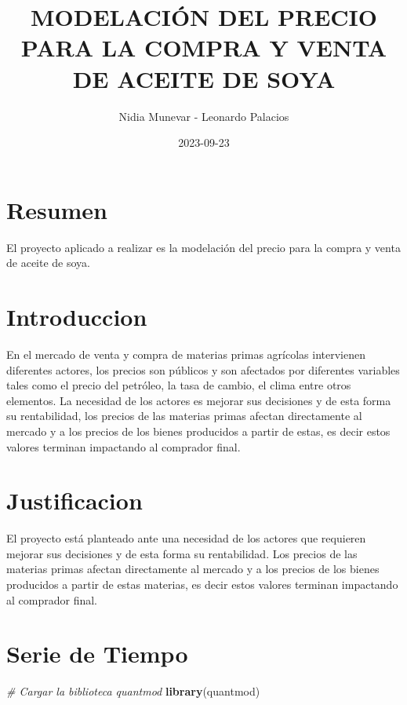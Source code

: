 \documentclass[
]{book}
\title{MODELACIÓN DEL PRECIO PARA LA COMPRA Y VENTA DE ACEITE DE SOYA}
\author{Nidia Munevar - Leonardo Palacios}
\date{2023-09-23}
\newenvironment{Shaded}{\begin{snugshade}}{\end{snugshade}}
\newcommand{\CommentTok}[1]{\textcolor[rgb]{0.56,0.35,0.01}{\textit{#1}}}
\newcommand{\FunctionTok}[1]{\textcolor[rgb]{0.13,0.29,0.53}{\textbf{#1}}}
\newcommand{\NormalTok}[1]{#1}
\begin{document}
\maketitle

{
\setcounter{tocdepth}{1}
\tableofcontents
}
\hypertarget{resumen}{%
\chapter{Resumen}\label{resumen}}

El proyecto aplicado a realizar es la modelación del precio para la compra y venta de aceite de soya.

\hypertarget{introduccion}{%
\chapter{Introduccion}\label{introduccion}}

En el mercado de venta y compra de materias primas agrícolas intervienen diferentes actores, los precios son públicos y son afectados por diferentes variables tales como el precio del petróleo, la tasa de cambio, el clima entre otros elementos. La necesidad de los actores es mejorar sus decisiones y de esta forma su rentabilidad, los precios de las materias primas afectan directamente al mercado y a los precios de los bienes producidos a partir de estas, es decir estos valores terminan impactando al comprador final.

\hypertarget{justificacion}{%
\chapter{Justificacion}\label{justificacion}}

El proyecto está planteado ante una necesidad de los actores que requieren mejorar sus decisiones y de esta forma su rentabilidad. Los precios de las materias primas afectan directamente al mercado y a los precios de los bienes producidos a partir de estas materias, es decir estos valores terminan impactando al comprador final.

\hypertarget{serie-de-tiempo}{%
\chapter{Serie de Tiempo}\label{serie-de-tiempo}}

\begin{Shaded}
\begin{Highlighting}[]
\CommentTok{\# Cargar la biblioteca quantmod}
\FunctionTok{library}\NormalTok{(quantmod)}
\end{Highlighting}
\end{Shaded}
\end{document}
